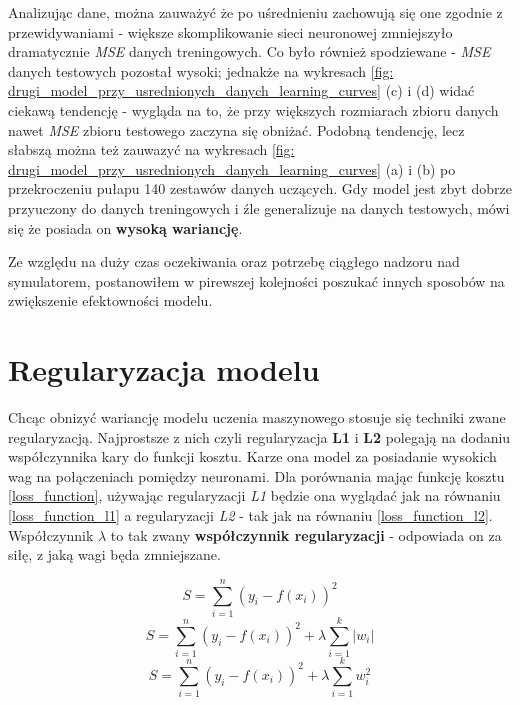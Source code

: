 \documentclass[12pt]{aghdpl}
\begin{document}
		Analizując dane, można zauważyć że po uśrednieniu zachowują się one zgodnie z przewidywaniami - większe skomplikowanie sieci neuronowej zmniejszyło dramatycznie \textit{MSE} danych treningowych. Co było również spodziewane - \textit{MSE} danych testowych pozostał wysoki; jednakże na wykresach \ref{fig: drugi_model_przy_usrednionych_danych_learning_curves} (c) i (d) widać ciekawą tendencję - wygląda na to, że przy większych rozmiarach zbioru danych nawet \textit{MSE} zbioru testowego zaczyna się obniżać. Podobną tendencję, lecz słabszą można też zauwazyć na wykresach \ref{fig: drugi_model_przy_usrednionych_danych_learning_curves} (a) i (b) po przekroczeniu pułapu 140 zestawów danych uczących. Gdy model jest zbyt dobrze przyuczony do danych treningowych i źle generalizuje na danych testowych, mówi się że posiada on \textbf{wysoką wariancję}.
		
		Ze względu na duży czas oczekiwania oraz potrzebę ciągłego nadzoru nad symulatorem, postanowiłem w pirewszej kolejności poszukać innych sposobów na zwiększenie efektowności modelu.
		
		\section{Regularyzacja modelu}
		Chcąc obnizyć wariancję modelu uczenia maszynowego stosuje się techniki zwane regularyzacją. Najprostsze z nich czyli regularyzacja \textbf{L1} i \textbf{L2} polegają na dodaniu współczynnika kary do funkcji kosztu. Karze ona model za posiadanie wysokich wag na połączeniach pomiędzy neuronami. Dla porównania mając funkcję kosztu \ref{loss_function}, używając regularyzacji \textit{L1} będzie ona wyglądać jak na równaniu \ref{loss_function_l1} a regularyzacji \textit{L2} - tak jak na równaniu \ref{loss_function_l2}. Współczynnik $\lambda$ to tak zwany \textbf{współczynnik regularyzacji} - odpowiada on za siłę, z jaką wagi będa zmniejszane.
		
		\begin{equation} \label{loss_function}
		S = \sum_{i = 1}^n (y_i - f(x_i))^2
		\end{equation}
		\begin{equation} \label{loss_function_l1}
		S = \sum_{i = 1}^n (y_i - f(x_i))^2 + \lambda \sum_{i = 1}^k |w_i|
		\end{equation}
		\begin{equation} \label{loss_function_l2}
		S = \sum_{i = 1}^n (y_i - f(x_i))^2 + \lambda \sum_{i = 1}^k w_i^2
		\end{equation}
		
\end{document}
